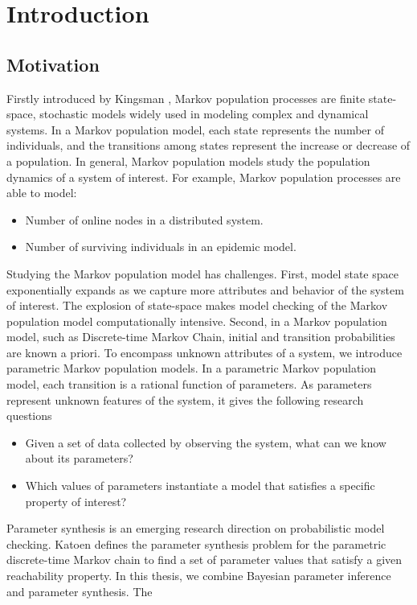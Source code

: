 \chapter{Introduction}
\section{Motivation}
Firstly introduced by Kingsman \cite{kingman1969markov}, Markov population processes are finite
state-space, stochastic models widely used in modeling complex and dynamical systems. In a Markov
population model, each state represents the number of individuals, and the transitions among states
represent the increase or decrease of a population. In general, Markov population models study the
population dynamics of a system of interest. For example, Markov population processes are able to
model:
\begin{itemize}
      \item Number of online nodes in a distributed system.
      \item Number of surviving individuals in an epidemic model.
\end{itemize}
Studying the Markov population model has challenges. First, model state space exponentially expands
as we capture more attributes and behavior of the system of interest. The explosion of state-space
makes model checking of the Markov population model computationally intensive. Second, in a Markov
population model, such as Discrete-time Markov Chain, initial and transition probabilities are known
a priori. To encompass unknown attributes of a system, we introduce parametric Markov population
models. In a parametric Markov population model, each transition is a rational function of
parameters. As parameters represent unknown features of the system, it gives the following research
questions
\begin{itemize}
      \item Given a set of data collected by observing the system, what can we know about its
            parameters?
      \item Which values of parameters instantiate a model that satisfies a specific property of
            interest?
\end{itemize}
Parameter synthesis is an emerging research direction on probabilistic model checking. Katoen
\cite{katoen2016probabilistic} defines the parameter synthesis problem for the parametric
discrete-time Markov chain to find a set of parameter values that satisfy a given reachability
property. In this thesis, we combine Bayesian parameter inference and parameter synthesis. The
